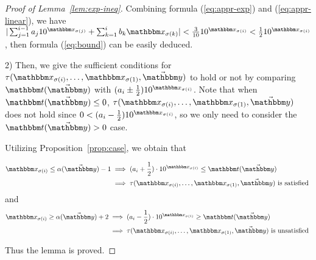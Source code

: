 \begin{proof}[Proof of Lemma~\ref{lem:exp-ineq}]
Combining formula (\ref{eq:appr-exp}) and (\ref{eq:appr-linear}), we have 
$\vert \sum_{j=1}^{i-1}a_j10^{\ivarx_{\sigma(j)}}
+ \sum_{k=1}^i b_k\ivarx_{\sigma(k)}\vert 
< \frac{3}{10} 10^{\ivarx_{\sigma(i)}}< \frac{1}{2} 10^{\ivarx_{\sigma(i)}}$, then formula (\ref{eq:bound}) can be easily deduced.  

2) Then, we give the sufficient conditions for $\tau(\ivarx_{\sigma(i)}, \ldots, \ivarx_{\sigma(1)}, \vec{\ivary})$ to hold or not by comparing $\iterm(\vec\ivary)$ with $(a_i \pm\frac{1}{2}) 10^{\ivarx_{\sigma(i)}}$. 
Note that when $\iterm(\vec\ivary)\le 0$, $\tau(\ivarx_{\sigma(i)}, \ldots, \ivarx_{\sigma(1)}, \vec{\ivary})$ does not hold since $0< (a_i-\frac{1}{2})10^{\ivarx_{\sigma(i)}}$, so we only need to consider the $\iterm(\vec\ivary)> 0$ case.

Utilizing Proposition~\ref{prop:case}, we obtain that 

\begin{equation}
    \begin{aligned}
        \ivarx_{\sigma(i)} \le \alpha(\vec\ivary)-1
        &\implies (a_i+\frac{1}{2}) \cdot 10^{\ivarx_{\sigma(i)}}\le \iterm(\vec\ivary)\\
       &\implies \tau(\ivarx_{\sigma(i)}, \ldots, \ivarx_{\sigma(1)}, \vec{\ivary}) \textrm{ is satisfied }
    \end{aligned}
\end{equation}
and
\begin{equation}
    \begin{aligned}
        \ivarx_{\sigma(i)} \ge \alpha(\vec\ivary)+2
        &\implies (a_i-\frac{1}{2})\cdot 10^{\ivarx_{\sigma(i)}}\ge\iterm(\vec\ivary)\\ 
        &\implies \tau(\ivarx_{\sigma(i)}, \ldots, \ivarx_{\sigma(1)}, \vec{\ivary}) \textrm{ is unsatisfied }
    \end{aligned}
\end{equation}

Thus the lemma is proved.
\end{proof}



